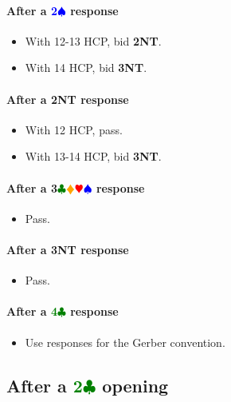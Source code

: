 \documentclass{article}
\newcommand{\Hs}{\textcolor{Red}{$\varheart$}}
\newcommand{\Ss}{\textcolor{Blue}{$\spadesuit$}}
\newcommand{\Ds}{\textcolor{Orange}{$\vardiamond$}}
\newcommand{\Cs}{\textcolor{Green}{$\clubsuit$}}
\newcommand{\NTs}{\textbf{\footnotesize{NT}}}
\renewcommand{\S}[1]{\textcolor{Blue}{\textbf{#1}\Ss}}
\newcommand{\C}[1]{\textcolor{Green}{\textbf{#1}\Cs}}
\newcommand{\NT}[1]{\textbf{#1\NTs}}
\newcommand{\suits}[1]{\textbf{#1}\Cs\Ds\Hs\Ss}
\begin{document}
\paragraph{After a \S{2} response}

\begin{itemize}
\item With 12-13 HCP, bid \NT{2}.
\item With 14 HCP, bid \NT{3}.
\end{itemize}

\paragraph{After a \NT{2} response}

\begin{itemize}
\item With 12 HCP, pass.
\item With 13-14 HCP, bid \NT{3}.
\end{itemize}

\paragraph{After a \suits{3} response}

\begin{itemize}
\item Pass.
\end{itemize}

\paragraph{After a \NT{3} response}

\begin{itemize}
\item Pass.
\end{itemize}

\paragraph{After a \C{4} response} 

\begin{itemize}
\item Use responses for the Gerber convention.
\end{itemize}

\subsection{After a \C{2} opening}
\end{document}
